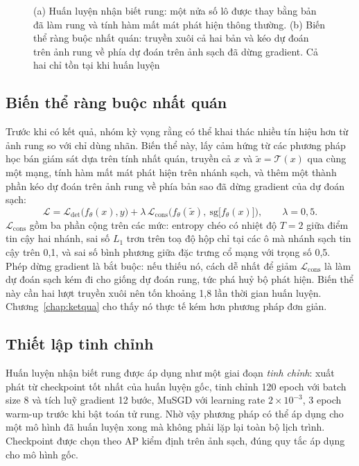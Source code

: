 \begin{figure}[H]
\centering
\resizebox{\textwidth}{!}{}
\caption{(a) Huấn luyện nhận biết rung: một nửa số lô được thay bằng bản đã làm rung và tính hàm mất mát phát hiện thông thường. (b) Biến thể ràng buộc nhất quán: truyền xuôi cả hai bản và kéo dự đoán trên ảnh rung về phía dự đoán trên ảnh sạch đã dừng gradient. Cả hai chỉ tồn tại khi huấn luyện}
\label{fig:huanluyenrung}
\end{figure}

\subsection{Biến thể ràng buộc nhất quán}

Trước khi có kết quả, nhóm kỳ vọng rằng có thể khai thác nhiều tín hiệu hơn từ ảnh rung so với chỉ dùng nhãn. Biến thể này, lấy cảm hứng từ các phương pháp học bán giám sát dựa trên tính nhất quán, truyền cả $x$ và $\tilde{x} = \mathcal{T}(x)$ qua cùng một mạng, tính hàm mất mát phát hiện trên nhánh sạch, và thêm một thành phần kéo dự đoán trên ảnh rung về phía bản sao đã dừng gradient của dự đoán sạch:
\begin{equation}
\mathcal{L} = \mathcal{L}_{\det}\big(f_\theta(x), y\big) + \lambda\, \mathcal{L}_{\text{cons}}\Big(f_\theta(\tilde{x}),\ \mathrm{sg}\big[f_\theta(x)\big]\Big), \qquad \lambda = 0{,}5.
\label{eq:vibcons}
\end{equation}
$\mathcal{L}_{\text{cons}}$ gồm ba phần cộng trên các mức: entropy chéo có nhiệt độ $T = 2$ giữa điểm tin cậy hai nhánh, sai số $L_1$ trơn trên toạ độ hộp chỉ tại các ô mà nhánh sạch tin cậy trên 0,1, và sai số bình phương giữa đặc trưng cổ mạng với trọng số 0,5. Phép dừng gradient là bắt buộc: nếu thiếu nó, cách dễ nhất để giảm $\mathcal{L}_{\text{cons}}$ là làm dự đoán sạch kém đi cho giống dự đoán rung, tức phá huỷ bộ phát hiện. Biến thể này cần hai lượt truyền xuôi nên tốn khoảng 1,8 lần thời gian huấn luyện. Chương~\ref{chap:ketqua} cho thấy nó thực tế kém hơn phương pháp đơn giản.

\subsection{Thiết lập tinh chỉnh}

Huấn luyện nhận biết rung được áp dụng như một giai đoạn \textit{tinh chỉnh}: xuất phát từ checkpoint tốt nhất của huấn luyện gốc, tinh chỉnh 120 epoch với batch size 8 và tích luỹ gradient 12 bước, MuSGD với learning rate $2\times10^{-3}$, 3 epoch warm-up trước khi bật toán tử rung. Nhờ vậy phương pháp có thể áp dụng cho một mô hình đã huấn luyện xong mà không phải lặp lại toàn bộ lịch trình. Checkpoint được chọn theo AP kiểm định trên ảnh sạch, đúng quy tắc áp dụng cho mô hình gốc.

